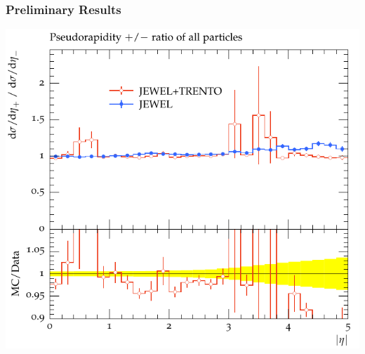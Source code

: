 \documentclass{beamer}
\begin{document}
\begin{frame}\frametitle{Preliminary Results}

        
        \begin{minipage}{1.0\textwidth}
		\includegraphics[scale=0.6]{images/trento_EtaPMRatio.pdf}        
        \end{minipage}
\end{frame}
\end{document}
